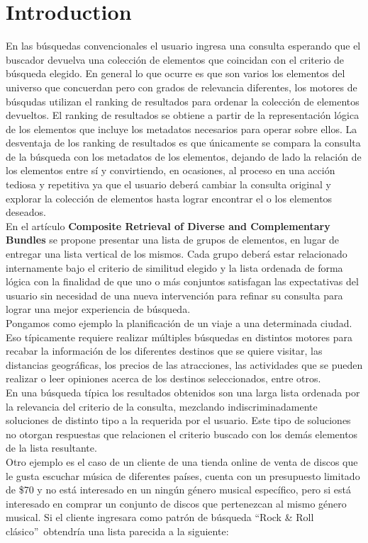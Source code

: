 
\section{Introduction}
En las búsquedas convencionales el usuario ingresa una consulta esperando que el buscador devuelva una colección de elementos que coincidan con el criterio de búsqueda elegido. En general lo que ocurre es que son varios los elementos del universo que concuerdan pero con grados de relevancia diferentes, los motores de búsqudas utilizan el ranking de resultados para ordenar la colección de elementos devueltos. El ranking de resultados se obtiene a partir de la representación lógica de los elementos que incluye los metadatos necesarios para operar sobre ellos. La desventaja de los ranking de resultados es que únicamente se compara la consulta de la búsqueda con los metadatos de los elementos, dejando de lado la relación de los elementos entre sí y convirtiendo, en ocasiones, al proceso en una acción tediosa y repetitiva ya que el usuario deberá cambiar la consulta original y explorar la colección de elementos hasta lograr encontrar el o los elementos deseados.\\
En el  artículo \textbf{Composite Retrieval of Diverse and Complementary Bundles}\cite{compositeRetrival} se propone presentar una lista de grupos de elementos, en lugar de entregar una lista vertical de los mismos. Cada grupo deberá estar relacionado internamente bajo el criterio de similitud elegido y la lista ordenada de forma lógica con la finalidad de que uno o más conjuntos satisfagan las expectativas del usuario sin necesidad de una nueva intervención para refinar su consulta para lograr una mejor experiencia de búsqueda.\\
Pongamos como ejemplo la planificación de un viaje a una determinada ciudad. Eso típicamente requiere realizar múltiples búsquedas en distintos motores para recabar la información de los diferentes destinos que se quiere visitar, las distancias geográficas, los precios de las atracciones, las actividades que se pueden realizar o leer opiniones acerca de los destinos seleccionados, entre otros.\\
En una búsqueda típica los resultados obtenidos son una larga lista ordenada por la relevancia del criterio de la consulta, mezclando indiscriminadamente soluciones de distinto tipo a la requerida por el usuario. Este tipo de soluciones no otorgan respuestas que relacionen el criterio buscado con los demás elementos de la lista resultante.\\
Otro ejemplo es el caso de un cliente de una tienda online de venta de discos que le gusta escuchar música de diferentes países, cuenta con un presupuesto limitado de \$70 y no está interesado en un ningún género musical específico, pero si está interesado en comprar un conjunto de discos que pertenezcan al mismo género musical. Si el cliente ingresara como patrón de búsqueda \textquotedblleft Rock \& Roll clásico\textquotedblright\ obtendría una lista parecida a la siguiente:
